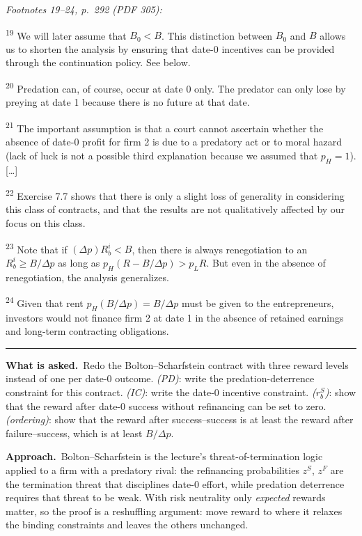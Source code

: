 \documentclass[11pt,a4paper]{article}
\newcommand{\asked}{\par\medskip\noindent\textbf{What is asked.}~}
\newcommand{\approach}{\par\smallskip\noindent\textbf{Approach.}~}
\newcommand{\stmtend}{\par\endgroup\nopagebreak\noindent\rule{\linewidth}{0.4pt}\par\medskip}
\begin{document}
\emph{Footnotes 19--24, p.~292 (PDF 305):}

\textsuperscript{19} We will later assume that \(B_0 < B\). This distinction between \(B_0\) and
\(B\) allows us to shorten the analysis by ensuring that date-0 incentives can be provided through
the continuation policy. See below.

\textsuperscript{20} Predation can, of course, occur at date 0 only. The predator can only lose by
preying at date 1 because there is no future at that date.

\textsuperscript{21} The important assumption is that a court cannot ascertain whether the absence
of date-0 profit for firm 2 is due to a predatory act or to moral hazard (lack of luck is not a
possible third explanation because we assumed that \(p_H = 1\)). {[}\ldots{]}

\textsuperscript{22} Exercise 7.7 shows that there is only a slight loss of generality in
considering this class of contracts, and that the results are not qualitatively affected by our
focus on this class.

\textsuperscript{23} Note that if \((\Delta p)R_b^i < B\), then there is always renegotiation to an
\(R_b^i \geqslant B/\Delta p\) as long as \(p_H(R - B/\Delta p) > p_L R\). But even in the absence
of renegotiation, the analysis generalizes.

\textsuperscript{24} Given that rent \(p_H(B/\Delta p) = B/\Delta p\) must be given to the
entrepreneurs, investors would not finance firm 2 at date 1 in the absence of retained earnings and
long-term contracting obligations.
\stmtend

\asked Redo the Bolton--Scharfstein contract with three reward levels instead of one per date-0
outcome. \emph{(PD)}: write the predation-deterrence constraint for this contract. \emph{(IC)}: write the
date-0 incentive constraint. \emph{($r_b^S$)}: show that the reward after date-0 success without
refinancing can be set to zero. \emph{(ordering)}: show that the reward after success--success is at least
the reward after failure--success, which is at least $B/\Delta p$.

\approach Bolton--Scharfstein is the lecture's threat-of-termination logic applied to a firm with a
predatory rival: the refinancing probabilities $z^S$, $z^F$ are the termination threat that disciplines
date-0 effort, while predation deterrence requires that threat to be weak. With risk neutrality only
\emph{expected} rewards matter, so the proof is a reshuffling argument: move reward to where it relaxes
the binding constraints and leaves the others unchanged.
\end{document}

